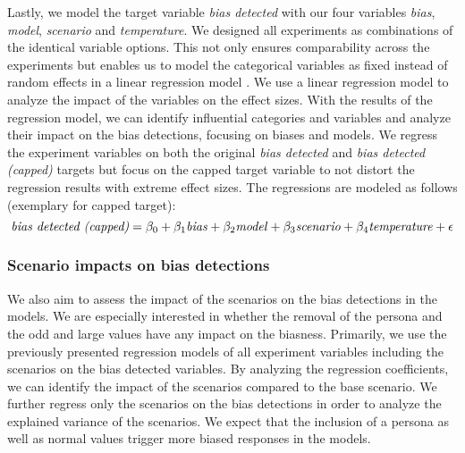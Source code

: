 \par Lastly, we model the target variable \textit{bias detected} with our four variables \textit{bias}, \textit{model}, \textit{scenario} and \textit{temperature}. We designed all experiments as combinations of the identical variable options. This not only ensures comparability across the experiments but enables us to model the categorical variables as fixed instead of random effects in a linear regression model \parencite{borenstein2021introduction, cooper2019handbook, nakagawa2023quantitative}. We use a linear regression model to analyze the impact of the variables on the effect sizes. With the results of the regression model, we can identify influential categories and variables and analyze their impact on the bias detections, focusing on biases and models. We regress the experiment variables on both the original \textit{bias detected} and \textit{bias detected (capped)} targets but focus on the capped target variable to not distort the regression results with extreme effect sizes. The regressions are modeled as follows (exemplary for capped target):
\begin{equation} \label{eq:general_regression_capped}
    \text{\textit{bias detected (capped)}} = \beta_0 + \beta_1 \text{\textit{bias}} + \beta_2 \text{\textit{model}} + \beta_3 \text{\textit{scenario}} + \beta_4 \text{\textit{temperature}} + \epsilon
\end{equation}


\subsubsection{Scenario impacts on bias detections}
\par We also aim to assess the impact of the scenarios on the bias detections in the models. We are especially interested in whether the removal of the persona and the odd and large values have any impact on the biasness. Primarily, we use the previously presented regression models of all experiment variables including the scenarios on the bias detected variables. By analyzing the regression coefficients, we can identify the impact of the scenarios compared to the base scenario. We further regress only the scenarios on the bias detections in order to analyze the explained variance of the scenarios. We expect that the inclusion of a persona as well as normal values trigger more biased responses in the models.

